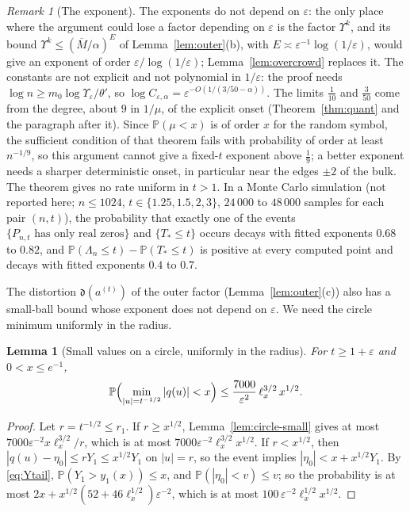 \documentclass[11pt]{amsart}
\newtheorem{lemma}[theorem]{Lemma}
\theoremstyle{definition}
\theoremstyle{remark}
\newtheorem{remark}[theorem]{Remark}
\numberwithin{equation}{section}
\newcommand{\PP}{\mathbb{P}}
\newcommand{\eps}{\varepsilon}
\begin{document}
\begin{remark}[The exponent]\label{rem:rate}
The exponents do not depend on $\eps$: the only place where the argument could lose a factor depending on $\eps$ is the factor $\Upsilon^k$, and its bound $\Upsilon^k\le(\overline M/\alpha)^E$ of Lemma~\ref{lem:outer}(b), with $E\asymp\eps^{-1}\log(1/\eps)$, would give an exponent of order $\eps/\log(1/\eps)$; Lemma~\ref{lem:overcrowd} replaces it. The constants are not explicit and not polynomial in $1/\eps$: the proof needs $\log n\ge m_0\log\Upsilon_\eps/\theta'$, so $\log C_{\eps,\alpha}=\eps^{-O(1/(3/50-\alpha))}$. The limits $\frac1{10}$ and $\frac3{50}$ come from the degree, about $9$ in $1/\mu$, of the explicit onset (Theorem~\ref{thm:quant} and the paragraph after it). Since $\PP(\mu<x)$ is of order $x$ for the random symbol, the sufficient condition of that theorem fails with probability of order at least $n^{-1/9}$, so this argument cannot give a fixed-$t$ exponent above $\frac19$; a better exponent needs a sharper deterministic onset, in particular near the edges $\pm2$ of the bulk. The theorem gives no rate uniform in $t>1$. In a Monte Carlo simulation (not reported here; $n\le1024$, $t\in\{1.25,1.5,2,3\}$, $24\,000$ to $48\,000$ samples for each pair $(n,t)$), the probability that exactly one of the events $\{P_{n,t}\text{ has only real zeros}\}$ and $\{T_*\le t\}$ occurs decays with fitted exponents $0.68$ to $0.82$, and $\PP(\Lambda_n\le t)-\PP(T_*\le t)$ is positive at every computed point and decays with fitted exponents $0.4$ to $0.7$.
\end{remark}

The distortion $\mathfrak d(a^{(t)})$ of the outer factor (Lemma~\ref{lem:outer}(c)) also has a small-ball bound whose exponent does not depend on $\eps$. We need the circle minimum uniformly in the radius.

\begin{lemma}[Small values on a circle, uniformly in the radius]\label{lem:circle-uniform}
For $t\ge1+\eps$ and $0<x\le e^{-1}$,
\[
\PP\Bigl(\min_{|u|=t^{-1/2}}|q(u)|<x\Bigr)\le\frac{7000}{\eps^2}\,\ell_x^{3/2}\,x^{1/2}.
\]
\end{lemma}

\begin{proof}
Let $r=t^{-1/2}\le r_1$. If $r\ge x^{1/2}$, Lemma~\ref{lem:circle-small} gives at most $7000\eps^{-2}x\ell_x^{3/2}/r$, which is at most $7000\eps^{-2}\ell_x^{3/2}x^{1/2}$. If $r<x^{1/2}$, then $|q(u)-\eta_0|\le rY_1\le x^{1/2}Y_1$ on $|u|=r$, so the event implies $|\eta_0|<x+x^{1/2}Y_1$. By \eqref{eq:Ytail}, $\PP(Y_1>y_1(x))\le x$, and $\PP(|\eta_0|<v)\le v$; so the probability is at most $2x+x^{1/2}(52+46\ell_x^{1/2})\eps^{-2}$, which is at most $100\,\eps^{-2}\ell_x^{1/2}x^{1/2}$.
\end{proof}
\end{document}

